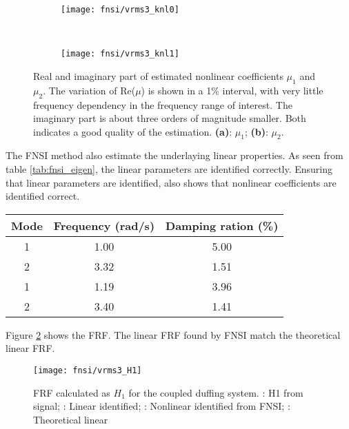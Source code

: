 \begin{figure}[!ht]
  \centering
  \begin{subfigure}[b]{0.45\textwidth}
    \texttt{[image: fnsi/vrms3\_knl0]}
    \caption{}
  \end{subfigure}
  ~
  \begin{subfigure}[b]{0.45\textwidth}
    \texttt{[image: fnsi/vrms3\_knl1]}
    \caption{}
  \end{subfigure}
  \caption{Real and imaginary part of estimated nonlinear coefficients $\mu_1$
    and $\mu_2$. The variation of Re($\mu$) is shown in a 1\% interval, with
    very little frequency dependency in the frequency range of interest.
    The imaginary part is about three orders of magnitude smaller. Both
    indicates a good quality of the estimation.
    \textbf{(a)}: $\mu_1$;
    \textbf{(b)}: $\mu_2$.
  }
  \label{fig:fnsi_knl}
\end{figure}

The FNSI method also estimate the underlaying linear properties. As seen from
table \ref{tab:fnsi_eigen}, the linear parameters are identified correctly.
Ensuring that linear parameters are identified, also shows that nonlinear
coefficients are identified correct.

\begin{center}
  \begin{tabular}{*{3}{c}}
    \hline
    Mode & Frequency (rad/s) & Damping ration (\%) \\
    \hline
    1 & 1.00 & 5.00 \\
    2 & 3.32 & 1.51 \\
    \hline
    1 & 1.19 & 3.96 \\
    2 & 3.40 & 1.41 \\
    \hline
  \end{tabular}
  \label{tab:fnsi_eigen}
\end{center}

Figure \ref{fig:fnsi_H1} shows the FRF. The linear FRF found by FNSI match the
theoretical linear FRF.

\begin{figure}[!ht]
  \centering
  \texttt{[image: fnsi/vrms3\_H1]}
  \caption{FRF calculated as $H_1$ for the coupled duffing system.
    \sampleline{}: H1 from signal;
    \textcolor{red}{}: Linear identified;
    \textcolor{orange}{}: Nonlinear identified from FNSI;
    \textcolor{blue}{}: Theoretical linear
  }
  \label{fig:fnsi_H1}
\end{figure}

